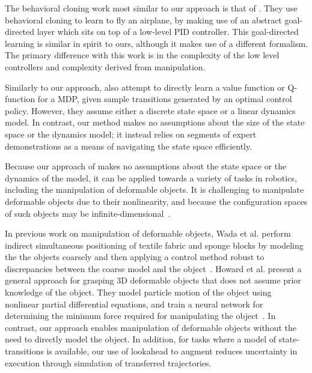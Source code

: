 The behavioral cloning work most similar to our approach is that of \citet{Isaac_ICML2003}.
They use behavioral cloning to learn to fly an airplane, by making use of an abstract goal-directed layer which sits on top of a low-level PID controller.
This goal-directed learning is similar in spirit to ours, although it makes use of a different formalism.
The primary difference with this work is in the complexity of the low level controllers and complexity derived from manipulation. 

Similarly to our approach, \citet{Dvijotham_ICML2010} also attempt to directly
learn a value function or Q-function for a MDP, given sample transitions
generated by an optimal control policy. However, they assume either a discrete
state space or a linear dynamics model. In contrast, our method makes no
assumptions about the size of the state space or the dynamics model; it instead
relies on segments of expert demonstrations as a means of navigating the state
space efficiently. 

Because our approach of \mmql{} makes no assumptions about the state space
or the dynamics of the model, it can be applied towards a variety of tasks
in robotics, including the manipulation of deformable objects.
It is challenging to manipulate deformable objects due to their nonlinearity,
and because the configuration spaces of such objects may be
infinite-dimensional~\cite{Lamiraux_IJRR2001}.

In previous work on manipulation of deformable objects,
Wada et al. perform indirect simultaneous positioning of
textile fabric and sponge blocks by modeling the
the objects coarsely and then applying a control method robust
to discrepancies between the coarse model and the
object~\cite{Wada_ArticMotion2000}. Howard et al. present a
general approach for grasping 3D deformable objects
that does not assume prior knowledge of the object.
They model particle motion of the object using nonlinear partial differential
equations, and train a neural network for determining the minimum force
required for manipulating the object~\cite{Howard_AutRobots2000}.
In contrast, our approach enables manipulation of deformable objects without
the need to directly model the object. In addition, for tasks
where a model of state-transitions is available, our use of
lookahead to augment \mmql{} reduces uncertainty in execution through
simulation of transferred trajectories.

